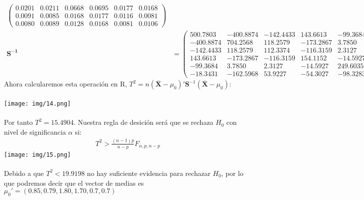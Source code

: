 \begin{sol}
\begin{itemize}
\begin{align*}
\begin{pmatrix}
        0.0201 & 0.0211 & 0.0668 & 0.0695 & 0.0177 & 0.0168 \\
        0.0091 & 0.0085 & 0.0168 & 0.0177 & 0.0116 & 0.0081 \\
        0.0080 & 0.0089 & 0.0128 & 0.0168 & 0.0081 & 0.0106
    \end{pmatrix} \\
    \mathbf{S^{-1}} &= \begin{pmatrix}
        500.7803 & -400.8874 & -142.4433 & 143.6613 & -99.3684 & -18.3431 \\
        -400.8874 & 704.2568 & 118.2579 & -173.2867 & 3.7850 & -162.5968 \\
        -142.4433 & 118.2579 & 112.3374 & -116.3159 & 2.3127 & 53.9227 \\
        143.6613 & -173.2867 & -116.3159 & 154.1152 & -14.5927 & -54.3027 \\
        -99.3684 & 3.7850 & 2.3127 & -14.5927 & 249.6035 & -98.3283 \\
        -18.3431 & -162.5968 & 53.9227 & -54.3027 & -98.3283 & 340.3370
    \end{pmatrix}
\end{align*}
Ahora calcularemos esta operación en R, $T^2=n(\bar{\mathbf{X}} - \mu_0)'\mathbf{S}^{-1}(\mathbf{\bar{X}}-\mu_0)$: \\\\
\texttt{[image: img/14.png]}\\\\
Por tanto $T^2 = 15.4904$. Nuestra regla de desición será que se rechaza $H_0$ con nivel de significancia $\alpha$ si:
\begin{align*}
T^2 > \frac{(n-1)p}{n-p}F_{\alpha,p,n-p}
\end{align*}
\texttt{[image: img/15.png]}\\\\
Debido a que $T^2<19.9198$ no hay suficiente evidencia para rechazar $H_0$, por lo que podremos decir que el vector de medias es  $\mu_0'=(0.85,0.79,1.80,1.70,0.7,0.7)$ \pagebreak


\end{itemize}
\end{sol}
